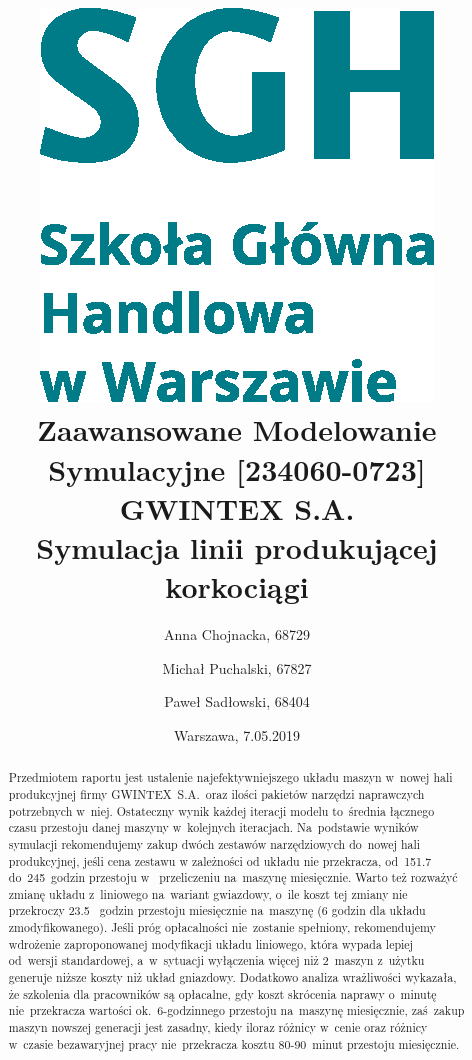 \documentclass[12pt, a4paper, oneside]{mwart} %
\begin{document}
\title{\includegraphics[width = 0.3 \textwidth]{wykresy/SGHlogotypCMYKpl.eps}\\
\bigskip
Zaawansowane Modelowanie Symulacyjne [234060-0723]\\ 
\bigskip
GWINTEX S.A.\\
Symulacja linii produkującej korkociągi}
\author{Anna Chojnacka, 68729 \and
Michał Puchalski, 67827 \and
Paweł Sadłowski, 68404 }
\date{Warszawa, 7.05.2019}
\maketitle

\begin{abstract}
Przedmiotem raportu jest ustalenie najefektywniejszego układu maszyn w~nowej hali produkcyjnej firmy GWINTEX~S.A.~oraz ilości pakietów narzędzi naprawczych potrzebnych w~niej. Ostateczny wynik każdej iteracji modelu to~średnia łącznego czasu przestoju danej maszyny w~kolejnych iteracjach. Na~podstawie wyników symulacji rekomendujemy zakup dwóch zestawów narzędziowych do~nowej hali produkcyjnej, jeśli cena zestawu w zależności od układu nie przekracza, od~151.7 do~245~godzin przestoju w~ przeliczeniu na~maszynę miesięcznie. Warto też rozważyć zmianę układu z~liniowego na~wariant gwiazdowy, o~ile koszt tej zmiany nie przekroczy 23.5 ~godzin przestoju miesięcznie na~maszynę (6 godzin dla układu zmodyfikowanego). Jeśli próg opłacalności nie~zostanie spełniony, rekomendujemy wdrożenie zaproponowanej modyfikacji układu liniowego, która wypada lepiej od~wersji standardowej, a~w~sytuacji wyłączenia więcej niż 2~maszyn z~użytku generuje niższe koszty niż układ gniazdowy. Dodatkowo analiza wrażliwości wykazała, że szkolenia dla pracowników są opłacalne, gdy koszt skrócenia naprawy o~minutę nie~przekracza wartości ok.~6-godzinnego przestoju na~maszynę miesięcznie, zaś~zakup maszyn nowszej generacji jest zasadny, kiedy iloraz różnicy w~cenie oraz różnicy w~czasie bezawaryjnej pracy nie~przekracza kosztu 80-90~minut przestoju miesięcznie. 
\end{abstract}

\pagebreak
\end{document}
